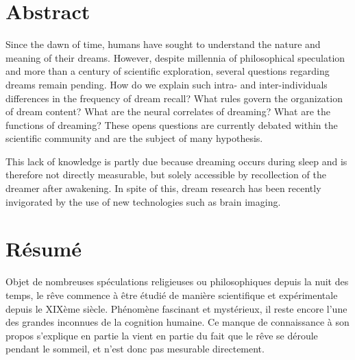 %
\chapter*{Abstract}
\label{sec:abstract}
\vspace*{-10mm}

Since the dawn of time, humans have sought to understand the nature and meaning of their dreams. However, despite millennia of philosophical speculation and more than a century of scientific exploration, several questions regarding dreams remain pending. How do we explain such intra- and inter-individuals differences in the frequency of dream recall? What rules govern the organization of dream content? What are the neural correlates of dreaming? What are the functions of dreaming? These opens questions are currently debated within the scientific community and are the subject of many hypothesis.

This lack of knowledge is partly due because dreaming occurs during sleep and is therefore not directly measurable, but solely accessible by recollection of the dreamer after awakening. In spite of this, dream research has been recently invigorated by the use of new technologies such as brain imaging.


\cleardoublepage

\chapter*{Résumé}
\label{sec:résumé}
\vspace*{-10mm}

Objet de nombreuses spéculations religieuses ou philosophiques depuis la nuit des temps, le rêve commence à être étudié de manière scientifique et expérimentale depuis le XIXème siècle. Phénomène fascinant et mystérieux, il reste encore l'une des grandes inconnues de la cognition humaine. Ce manque de connaissance à son propos s'explique en partie la vient en partie du fait que le rêve se déroule pendant le sommeil, et n'est donc pas mesurable directement.
